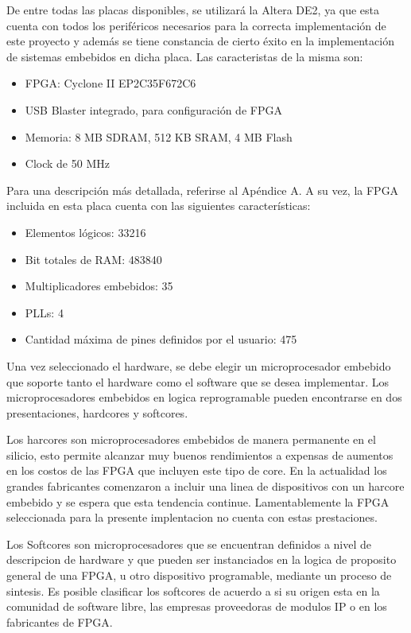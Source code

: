 De entre todas las placas disponibles, se utilizará la Altera DE2, ya que esta cuenta con todos los periféricos necesarios para la correcta implementación de este proyecto y además se tiene constancia de cierto éxito en la implementación de sistemas embebidos en dicha placa. Las caracteristas de la misma son:

\begin{itemize}
	\item FPGA: Cyclone II EP2C35F672C6
	\item USB Blaster integrado, para configuración de FPGA
	\item Memoria: 8 MB SDRAM, 512 KB SRAM, 4 MB Flash
	\item Clock de 50 MHz
\end{itemize}

Para una descripción más detallada, referirse al Apéndice A. A su vez, la FPGA incluida en esta placa cuenta con las siguientes características:

\begin{itemize}
	\item Elementos lógicos: 33216
	\item Bit totales de RAM: 483840
	\item Multiplicadores embebidos: 35
	\item PLLs: 4
	\item Cantidad máxima de pines definidos por el usuario: 475
\end{itemize}

Una vez seleccionado el hardware, se debe elegir un microprocesador embebido que soporte tanto el hardware como el software que se desea implementar. Los microprocesadores embebidos en logica reprogramable pueden encontrarse en dos presentaciones, hardcores y softcores.

Los harcores son microprocesadores embebidos de manera permanente en el silicio, esto permite alcanzar muy buenos rendimientos a expensas de aumentos en los costos de las FPGA que incluyen este tipo de core. En la actualidad los grandes fabricantes comenzaron a incluir una linea de dispositivos con un harcore embebido y se espera que esta tendencia continue. Lamentablemente la FPGA seleccionada para la presente implentacion no cuenta con estas prestaciones. 

Los Softcores son microprocesadores que se encuentran definidos a nivel de descripcion de hardware y que pueden ser instanciados en la logica de proposito general de una FPGA, u otro dispositivo programable, mediante un proceso de sintesis. Es posible clasificar los softcores de acuerdo a si su origen esta en la comunidad de software libre, las empresas proveedoras de modulos IP o en los fabricantes de FPGA. 




